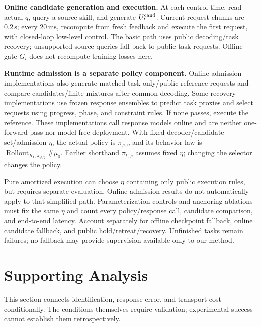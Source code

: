 \documentclass[11pt]{article}
\begin{document}
\textbf{Online candidate generation and execution.} At each control time, read actual
$q$, query a source skill, and generate $U_t^{\rm cand}$. Current request chunks are
$0.2\,\mathrm{s}$; every $20\,\mathrm{ms}$, recompute from fresh feedback and execute
the first request, with closed-loop low-level control. The basic path uses public
decoding/task recovery; unsupported source queries fall back to public task requests.
Offline gate $G_i$ does not recompute training losses here.

\textbf{Runtime admission is a separate policy component.} Online-admission implementations
also generate matched task-only/public reference requests and compare candidates/finite
mixtures after common decoding. Some recovery implementations use frozen response
ensembles to predict task proxies and select requests using progress, phase, and
constraint rules. If none passes, execute the reference. These implementations call
response models online and are neither one-forward-pass nor model-free deployment.
With fixed decoder/candidate set/admission $\eta$, the actual policy is
$\pi_{\varphi,\eta}$ and its behavior law is
$\operatorname{Rollout}_{K_t,\pi_{\varphi,\eta}}\#\mu_0$.
Earlier shorthand $\pi_{t,\varphi}$ assumes fixed $\eta$; changing the selector changes
the policy.

Pure amortized execution can choose $\eta$ containing only public execution rules,
but requires separate evaluation. Online-admission results do not automatically apply
to that simplified path. Parameterization controls and anchoring ablations must fix
the same $\eta$ and count every policy/response call, candidate comparison, and
end-to-end latency. Account separately for offline checkpoint fallback, online
candidate fallback, and public hold/retreat/recovery. Unfinished tasks remain failures;
no fallback may provide supervision available only to our method.

\section{Supporting Analysis}
\label{sec:theory}
This section connects identification, response error, and transport cost conditionally.
The conditions themselves require validation; experimental success cannot establish them retrospectively.
\end{document}
